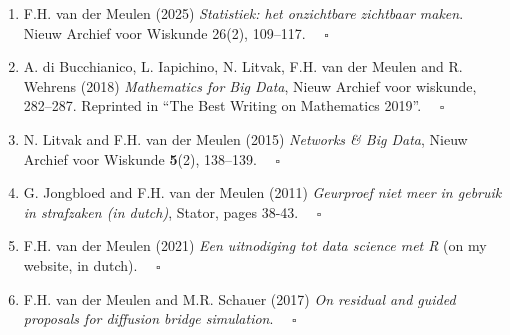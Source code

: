\documentclass[
10pt, %
a4paper, %
oneside, %
headinclude,footinclude, %
BCOR5mm, %
]{scrartcl}
\begin{document}
\begin{enumerate}
\item {\sc F.H. van der Meulen} (2025) {\it Statistiek: het onzichtbare zichtbaar maken}. Nieuw Archief voor Wiskunde 26(2), 109--117. \hspace*{\fill}  $\quad \square$


\item {\sc A. di Bucchianico, L. Iapichino, N. Litvak, F.H. van der Meulen and R. Wehrens (2018)} {\it  Mathematics for Big Data}, Nieuw Archief voor wiskunde, 282--287. Reprinted in ``The Best Writing on Mathematics 2019''.\hspace*{\fill}  $\quad \square$



\item {\sc N. Litvak and F.H. van der Meulen (2015)} {\it  Networks \& Big Data}, Nieuw Archief voor Wiskunde {\bf 5}(2), 138--139.\hspace*{\fill}  $\quad \square$

\item {\sc G. Jongbloed and F.H. van der Meulen (2011)} {\it  Geurproef niet meer in gebruik in strafzaken (in dutch)}, Stator, pages 38-43.\hspace*{\fill}  $\quad \square$

\item {\sc F.H. van der Meulen (2021)} {\it  Een uitnodiging tot data science met R}  (on my website, in dutch).\hspace*{\fill}  $\quad \square$

\item {\sc F.H. van der Meulen and M.R. Schauer (2017)} {\it  On residual and guided proposals for diffusion bridge simulation}.  \hspace*{\fill} $\quad \square$



\end{enumerate}
\end{document}
